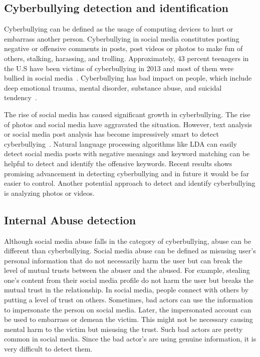 \documentclass[sigconf]{acmart}
\begin{document}
\subsection{Cyberbullying detection and identification}
Cyberbullying can be defined as the usage of computing devices to hurt or embarrass another person.  Cyberbullying in social media constitutes posting negative or offensive comments in posts, post videos or photos to make fun of others,  stalking, harassing, and trolling.  Approximately, 43 percent teenagers in the U.S have been victims of cyberbullying in 2013 and most of them were bullied in social media~\cite{cyberbullying}. Cyberbullying has bad impact on people, which include deep emotional trauma, mental disorder, substance abuse, and suicidal tendency~\cite{cb-effect}. 

The rise of social media has caused significant growth in cyberbullying. The rise of photos and social media have aggravated the situation. However, text analysis or social media post analysis has become impressively smart to detect cyberbullying~\cite{HosseinmardiMRH1}. Natural language processing algorithms like LDA can easily detect social media posts with negative meanings and keyword matching can be helpful to detect and identify the offensive keywords. Recent results shows promising advancement in detecting cyberbullying and in future it would be far easier to control. Another potential approach to detect and identify cyberbullying is analyzing photos or videos.

\subsection{Internal Abuse detection}
Although social media abuse falls in the category of cyberbullying, abuse can be different than cyberbullying. Social media abuse can be defined as misusing user's personal information that do not necessarily harm the user but can break the level of mutual trusts between the abuser and the abused. For example, stealing one's content from their social media profile do not harm the user but breaks the mutual trust in the relationship. In social media, people connect with others by putting a level of trust on others. Sometimes, bad actors can use the information to impersonate the person on social media. Later, the impersonated account can be used to embarrass or demean the victim. This might not be necessary causing mental harm to the victim but misusing the trust. Such bad actors are pretty common in social media. Since the bad actor's are using genuine information, it is very difficult to detect them.
\end{document}
